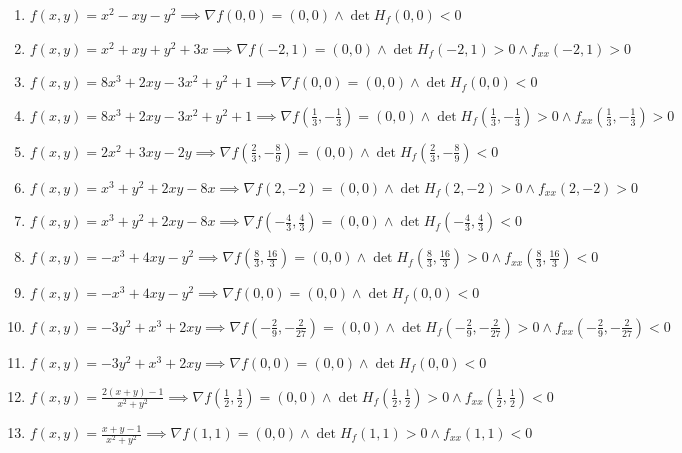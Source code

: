 \documentclass[11pt,a4paper]{article}
\begin{document}
\begin{enumerate}
\item $\displaystyle f(x, y) = x^{2} - xy - y^{2} \implies \nabla f(0, 0) = (0, 0) \land \det H_{f}(0, 0) < 0$
\item $\displaystyle f(x, y) = x^{2} + xy + y^{2} + 3x \implies \nabla f(-2, 1) = (0, 0) \land \det H_{f}(-2, 1) > 0 \land f_{xx}(-2, 1) > 0$
\item $\displaystyle f(x, y) = 8x^{3} + 2xy - 3x^{2} + y^{2} + 1 \implies \nabla f(0, 0) = (0, 0) \land \det H_{f}(0, 0) < 0$
\item $\displaystyle f(x, y) = 8x^{3} + 2xy - 3x^{2} + y^{2} + 1 \implies \nabla f\left( \frac{1}{3}, -\frac{1}{3} \right) = (0, 0) \land \det H_{f}\left( \frac{1}{3}, -\frac{1}{3} \right) > 0 \land f_{xx}\left( \frac{1}{3}, -\frac{1}{3} \right) > 0$
\item $\displaystyle f(x, y) = 2x^{2} + 3xy - 2y \implies \nabla f\left( \frac{2}{3}, -\frac{8}{9} \right) = (0, 0) \land \det H_{f}\left( \frac{2}{3}, -\frac{8}{9} \right) < 0$
\item $\displaystyle f(x, y) = x^{3} + y^{2} + 2xy - 8x \implies \nabla f(2, -2) = (0, 0) \land \det H_{f}(2, -2) > 0 \land f_{xx}(2, -2) > 0$
\item $\displaystyle f(x, y) = x^{3} + y^{2} + 2xy - 8x \implies \nabla f\left( -\frac{4}{3}, \frac{4}{3} \right) = (0, 0) \land \det H_{f}\left( -\frac{4}{3}, \frac{4}{3} \right) < 0$
\item $\displaystyle f(x, y) = -x^{3} + 4xy - y^{2} \implies \nabla f\left( \frac{8}{3}, \frac{16}{3} \right) = (0, 0) \land \det H_{f}\left( \frac{8}{3}, \frac{16}{3} \right) > 0 \land f_{xx}\left( \frac{8}{3}, \frac{16}{3} \right) < 0$
\item $\displaystyle f(x, y) = -x^{3} + 4xy - y^{2} \implies \nabla f(0, 0) = (0, 0) \land \det H_{f}(0, 0) < 0$
\item $\displaystyle f(x, y) = -3y^{2} + x^{3} + 2xy \implies \nabla f\left( -\frac{2}{9}, -\frac{2}{27} \right) = (0, 0) \land \det H_{f}\left( -\frac{2}{9}, -\frac{2}{27} \right) > 0 \land f_{xx}\left( -\frac{2}{9}, -\frac{2}{27} \right) < 0$
\item $\displaystyle f(x, y) = -3y^{2} + x^{3} + 2xy \implies \nabla f(0, 0) = (0, 0) \land \det H_{f}(0, 0) < 0$
\item $\displaystyle f(x, y) = \frac{2(x + y) - 1}{x^{2} + y^{2}} \implies \nabla f\left( \frac{1}{2}, \frac{1}{2} \right) = (0, 0) \land \det H_{f}\left( \frac{1}{2}, \frac{1}{2} \right) > 0 \land f_{xx}\left( \frac{1}{2}, \frac{1}{2} \right) < 0$
\item $\displaystyle f(x, y) = \frac{x + y - 1}{x^{2} + y^{2}} \implies \nabla f(1, 1) = (0, 0) \land \det H_{f}(1, 1) > 0 \land f_{xx}(1, 1) < 0$

\end{enumerate}
\end{document}
